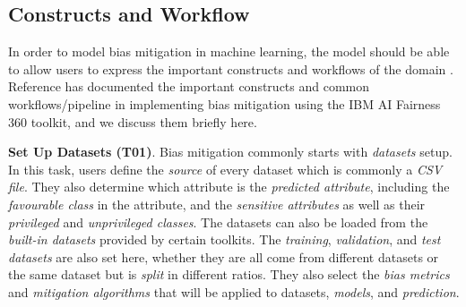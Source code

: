 \documentclass[sigconf,review]{acmart}
\begin{document}


\subsection{Constructs and Workflow}
\label{sec:constructs_and_workflow}

In order to model bias mitigation in machine learning, the model should be able to allow users to express the important constructs and workflows of the domain \cite{volter2013model}. Reference \cite{bellamy2018ai} has documented the important constructs and common workflows/pipeline in implementing bias mitigation using the IBM AI Fairness 360 toolkit, and we discuss them briefly here.

%
%

\textbf{Set Up Datasets (T01)}. Bias mitigation commonly starts with \textit{datasets} setup. In this task, users define the \textit{source} of every dataset which is commonly a \textit{CSV file}. They also determine which attribute is the \textit{predicted attribute}, including the \textit{favourable class} in the attribute, and the \textit{sensitive attributes} as well as their \textit{privileged} and \textit{unprivileged classes}. The datasets can also be loaded from the \textit{built-in datasets} provided by certain toolkits. 
The \textit{training}, \textit{validation}, and \textit{test datasets} are also set here, whether they are all come from different datasets or the same dataset but is \textit{split} in different ratios. They also select the \textit{bias metrics} and \textit{mitigation algorithms} that will be applied to datasets, \textit{models}, and \textit{prediction}. 
\end{document}
